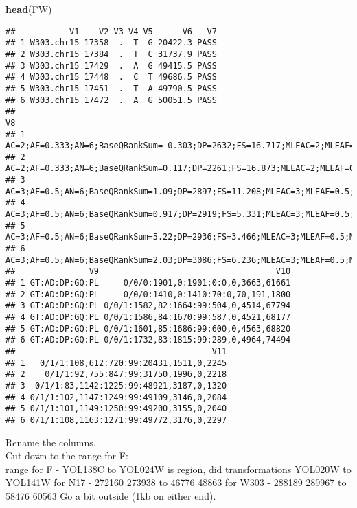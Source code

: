 \documentclass[
]{article}
\newenvironment{Shaded}{\begin{snugshade}}{\end{snugshade}}
\newcommand{\FunctionTok}[1]{\textcolor[rgb]{0.13,0.29,0.53}{\textbf{#1}}}
\newcommand{\NormalTok}[1]{#1}
\begin{document}
\begin{Shaded}
\begin{Highlighting}[]
\FunctionTok{head}\NormalTok{(FW)}
\end{Highlighting}
\end{Shaded}

\begin{verbatim}
##           V1    V2 V3 V4 V5      V6   V7
## 1 W303.chr15 17358  .  T  G 20422.3 PASS
## 2 W303.chr15 17384  .  T  C 31737.9 PASS
## 3 W303.chr15 17429  .  A  G 49415.5 PASS
## 4 W303.chr15 17448  .  C  T 49686.5 PASS
## 5 W303.chr15 17451  .  T  A 49790.5 PASS
## 6 W303.chr15 17472  .  A  G 50051.5 PASS
##                                                                                                                                       V8
## 1 AC=2;AF=0.333;AN=6;BaseQRankSum=-0.303;DP=2632;FS=16.717;MLEAC=2;MLEAF=0.333;MQ=60;MQRankSum=0;QD=28.36;ReadPosRankSum=-3.092;SOR=1.43
## 2  AC=2;AF=0.333;AN=6;BaseQRankSum=0.117;DP=2261;FS=16.873;MLEAC=2;MLEAF=0.333;MQ=60;MQRankSum=0;QD=28.73;ReadPosRankSum=0.389;SOR=0.941
## 3         AC=3;AF=0.5;AN=6;BaseQRankSum=1.09;DP=2897;FS=11.208;MLEAC=3;MLEAF=0.5;MQ=60;MQRankSum=0;QD=17.1;ReadPosRankSum=3.67;SOR=1.394
## 4        AC=3;AF=0.5;AN=6;BaseQRankSum=0.917;DP=2919;FS=5.331;MLEAC=3;MLEAF=0.5;MQ=60;MQRankSum=0;QD=17.02;ReadPosRankSum=4.01;SOR=1.076
## 5          AC=3;AF=0.5;AN=6;BaseQRankSum=5.22;DP=2936;FS=3.466;MLEAC=3;MLEAF=0.5;MQ=60;MQRankSum=0;QD=16.96;ReadPosRankSum=5.47;SOR=0.99
## 6         AC=3;AF=0.5;AN=6;BaseQRankSum=2.03;DP=3086;FS=6.236;MLEAC=3;MLEAF=0.5;MQ=60;MQRankSum=0;QD=16.22;ReadPosRankSum=1.72;SOR=1.086
##               V9                                    V10
## 1 GT:AD:DP:GQ:PL     0/0/0:1901,0:1901:0:0,0,3663,61661
## 2 GT:AD:DP:GQ:PL     0/0/0:1410,0:1410:70:0,70,191,1800
## 3 GT:AD:DP:GQ:PL 0/0/1:1582,82:1664:99:504,0,4514,67794
## 4 GT:AD:DP:GQ:PL 0/0/1:1586,84:1670:99:587,0,4521,68177
## 5 GT:AD:DP:GQ:PL 0/0/1:1601,85:1686:99:600,0,4563,68820
## 6 GT:AD:DP:GQ:PL 0/0/1:1732,83:1815:99:289,0,4964,74494
##                                        V11
## 1   0/1/1:108,612:720:99:20431,1511,0,2245
## 2    0/1/1:92,755:847:99:31750,1996,0,2218
## 3  0/1/1:83,1142:1225:99:48921,3187,0,1320
## 4 0/1/1:102,1147:1249:99:49109,3146,0,2084
## 5 0/1/1:101,1149:1250:99:49200,3155,0,2040
## 6 0/1/1:108,1163:1271:99:49772,3176,0,2297
\end{verbatim}

Rename the columns.\\
Cut down to the range for F:\\
range for F - YOL138C to YOL024W is region, did transformations YOL020W
to YOL141W for N17 - 272160 273938 to 46776 48863 for W303 - 288189
289967 to 58476 60563 Go a bit outside (1kb on either end).
\end{document}
